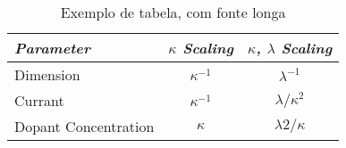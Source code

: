 \begin{table}[hb]
\renewcommand{\baselinestretch}{1.4}%
\small
   \centering
   \caption{Exemplo de tabela, com fonte longa}
	\begin{center}
	   \begin{tabular}{lcc}
	       \hline%
	       \itshape Parameter&
	           \itshape $\kappa$ Scaling&
	           \itshape $\kappa$, $\lambda$ Scaling\\*
	       \hline
	       Dimension&
	           $\kappa^{-1}$&
	           $\lambda^{-1}$\\*
	       Currant&
	           $\kappa^{-1}$&
	               $\lambda/\kappa^{2}$\\*
	       Dopant Concentration&
	           $\kappa$&
	           $\lambda2/\kappa$\\*
	       \hline
	   \end{tabular}
	\end{center}
    \renewcommand{\baselinestretch}{1.0}
\end{table}


